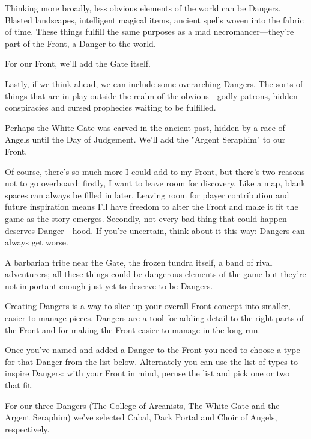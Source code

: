 Thinking more broadly, less obvious elements of the world can be Dangers. Blasted landscapes, intelligent magical items, ancient spells woven into the fabric of time. These things fulfill the same purposes as a mad necromancer—they're part of the Front, a Danger to the world.

       
\startExample
For our Front, we'll add the Gate itself.
\stopExample
       

Lastly, if we think ahead, we can include some overarching Dangers. The sorts of things that are in play outside the realm of the obvious—godly patrons, hidden conspiracies and cursed prophecies waiting to be fulfilled.

       
\startExample
Perhaps the White Gate was carved in the ancient past, hidden by a race of Angels until the Day of Judgement. We'll add the "Argent Seraphim" to our Front.
\stopExample
       

Of course, there's so much more I could add to my Front, but there's two reasons not to go overboard: firstly, I want to leave room for discovery. Like a map, blank spaces can always be filled in later. Leaving room for player contribution and future inspiration means I'll have freedom to alter the Front and make it fit the game as the story emerges. Secondly, not every bad thing that could happen deserves Danger—hood. If you're uncertain, think about it this way: Dangers can always get worse.

       
\startExample
A barbarian tribe near the Gate, the frozen tundra itself, a band of rival adventurers; all these things could be dangerous elements of the game but they're not important enough just yet to deserve to be Dangers.
\stopExample
       

Creating Dangers is a way to slice up your overall Front concept into smaller, easier to manage pieces. Dangers are a tool for adding detail to the right parts of the Front and for making the Front easier to manage in the long run.

       

Once you've named and added a Danger to the Front you need to choose a type for that Danger from the list below. Alternately you can use the list of types to inspire Dangers: with your Front in mind, peruse the list and pick one or two that fit.

       
\startExample
For our three Dangers (The College of Arcanists, The White Gate and the Argent Seraphim) we've selected Cabal, Dark Portal and Choir of Angels, respectively.
\stopExample
       
